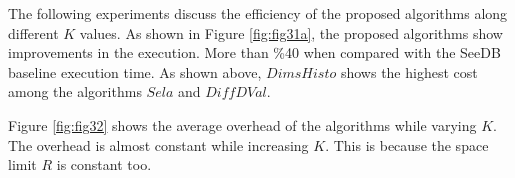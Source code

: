 The following experiments discuss the efficiency of the proposed algorithms along different $K$ values.
%
As shown in Figure \ref{fig:fig31a}, the proposed algorithms show improvements in the execution. 
%
More than \%40 when compared with the SeeDB baseline execution time. 
%
As shown above, $DimsHisto$ shows the highest cost among the algorithms $Sela$ and $Diff DVal$. 
%

Figure \ref{fig:fig32} shows the average overhead of the algorithms while varying $K$.
%
The overhead is almost constant while increasing $K$.
%
This is because the space limit $R$ is constant too.